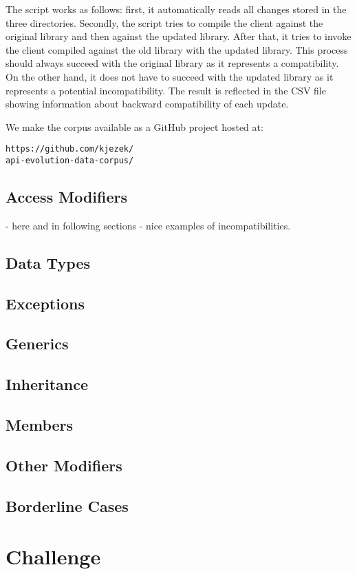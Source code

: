 \documentclass[conference]{IEEEtran}
\begin{document}
The script works as follows: first, it automatically reads all changes stored in the three directories. Secondly, the script tries to compile the client against the original library and then against the updated library. After that, it tries to invoke the client compiled against the old library with the updated library. This process should always succeed with the original library as it represents a compatibility. On the other hand, it does not have to succeed with the updated library as it represents a potential incompatibility. The result is reflected in the CSV file showing information about backward compatibility of each update.


We make the corpus available as a GitHub project hosted at: 
\begin{verbatim}
https://github.com/kjezek/
api-evolution-data-corpus/
\end{verbatim}


\subsection{Access Modifiers}
- here and in following sections - nice examples of incompatibilities.
\subsection{Data Types}
\subsection{Exceptions}
\subsection{Generics}
\subsection{Inheritance}
\subsection{Members}
\subsection{Other Modifiers}
\subsection{Borderline Cases}


\section{Challenge}
\end{document}
